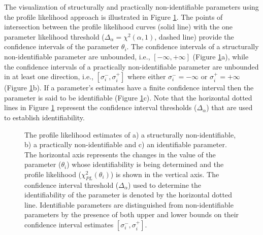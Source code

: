 \documentclass[10pt]{article}
\begin{document}
	The visualization of structurally and practically non-identifiable parameters using the profile likelihood approach is illustrated in Figure \ref{fig:identtypes}. The points of intersection between the profile likelihood curves (solid line) with the one parameter likelihood threshold ($\Delta_{\alpha} = \chi^2(\alpha,1)$, dashed line) provide the confidence intervals of the parameter $\theta_i$. The confidence intervals of a structurally non-identifiable parameter are unbounded, i.e., $\left[-\infty, +\infty\right]$ (Figure \ref{fig:identtypes}a), while the confidence intervals of a practically non-identifiable parameter are unbounded in at least one direction, i.e., $\left[\sigma_{i}^-,\sigma_{i}^+\right]$ where either $\sigma_{i}^- = -\infty$ or $\sigma_{i}^+ = +\infty$ (Figure \ref{fig:identtypes}b). If a parameter's estimates have a finite confidence interval then the parameter is said to be identifiable (Figure \ref{fig:identtypes}c). Note that the horizontal dotted lines in Figure \ref{fig:identtypes} represent the confidence interval thresholds ($\Delta_{\alpha}$) that are used to establish identifiability.
	
	\begin{figure}[!tbhp]
		\caption{The profile likelihood estimates of a) a structurally non-identifiable, b) a practically non-identifiable and c) an identifiable parameter. The horizontal axis represents the changes in the value of the parameter ($\theta_i$) whose identifiability is being determined and the profile likelihood ($\chi^2_{PL}(\theta_i)$) is shown in the vertical axis. The confidence interval threshold ($\Delta_{\alpha}$) used to determine the identifiability of the parameter is denoted by the horizontal dotted line. Identifiable parameters are distinguished from non-identifiable parameters by the presence of both upper and lower bounds on their confidence interval estimates $\left[\sigma_{i}^-,\sigma_{i}^+\right]$. }\label{fig:identtypes}
	\end{figure}	
	
\end{document}
